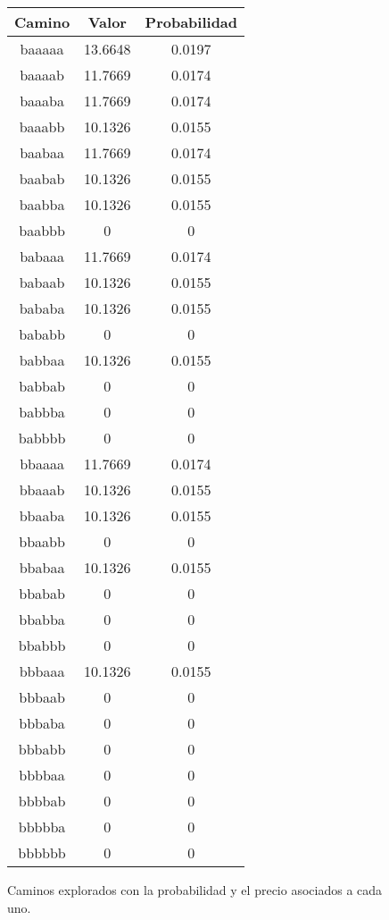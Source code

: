 \begin{figure}[hbpt]
\begin{minipage}{0.48\textwidth}
\begin{center}
\begin{tabular}{|c|c|c|}
\hline
\end{tabular}
\end{center}
\end{minipage}
\begin{minipage}{0.48\textwidth}
\begin{center}
\begin{tabular}{|c|c|c|}
\hline
\textbf{Camino} & \textbf{Valor} & \textbf{Probabilidad} \\
\hline
baaaaa  &  13.6648  &  0.0197  \\
baaaab  &  11.7669  &  0.0174  \\
baaaba  &  11.7669  &  0.0174  \\
baaabb  &  10.1326  &  0.0155  \\
baabaa  &  11.7669  &  0.0174  \\
baabab  &  10.1326  &  0.0155  \\
baabba  &  10.1326  &  0.0155  \\
baabbb  & 0 & 0 \\
babaaa  &  11.7669  &  0.0174  \\
babaab  &  10.1326  &  0.0155  \\
bababa  &  10.1326  &  0.0155  \\
bababb  & 0 & 0 \\
babbaa  &  10.1326  &  0.0155  \\
babbab  & 0 & 0 \\
babbba  & 0 & 0 \\
babbbb  & 0 & 0 \\
bbaaaa  &  11.7669  &  0.0174  \\
bbaaab  &  10.1326  &  0.0155  \\
bbaaba  &  10.1326  &  0.0155  \\
bbaabb  & 0 & 0 \\
bbabaa  &  10.1326  &  0.0155  \\
bbabab  & 0 & 0 \\
bbabba  & 0 & 0 \\
bbabbb  & 0 & 0 \\
bbbaaa  &  10.1326  &  0.0155  \\
bbbaab  & 0 & 0 \\
bbbaba  & 0 & 0 \\
bbbabb  & 0 & 0 \\
bbbbaa  & 0 & 0 \\
bbbbab  & 0 & 0 \\
bbbbba  & 0 & 0 \\
bbbbbb  & 0 & 0 \\
\hline
\end{tabular}
\end{center}
\end{minipage}
\caption{Caminos explorados con la probabilidad y el precio asociados a cada uno.}
\label{fig:2_4b}
\end{figure}